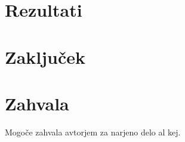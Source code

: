 \documentclass{acm_proc_article-sp}
\begin{document}
\section{Rezultati}

\section{Zaklju\v{c}ek}

\section{Zahvala}
Mogoče zahvala avtorjem za narjeno delo al kej.




\balancecolumns
\end{document}
